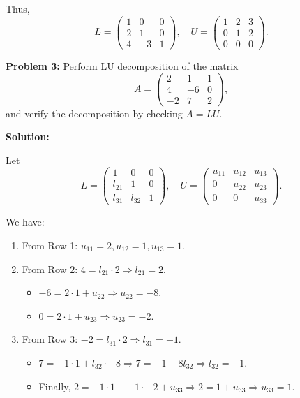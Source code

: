 \documentclass[
  letterpaper,
  DIV=11,
  numbers=noendperiod]{scrreprt}
\providecommand{\tightlist}{%
  \setlength{\itemsep}{0pt}\setlength{\parskip}{0pt}}\usepackage{longtable,booktabs,array}
\theoremstyle{plain}
\theoremstyle{definition}
\theoremstyle{remark}
\begin{document}
Thus,
\[ L = \begin{pmatrix} 1 & 0 & 0 \\ 2 & 1 & 0 \\ 4 & -3 & 1 \end{pmatrix}, \quad U = \begin{pmatrix} 1 & 2 & 3 \\ 0 & 1 & 2 \\ 0 & 0 & 0 \end{pmatrix}. \]

\textbf{Problem 3:} Perform LU decomposition of the matrix
\[ A = \begin{pmatrix} 2 & 1 & 1 \\ 4 & -6 & 0 \\ -2 & 7 & 2 \end{pmatrix}, \]
and verify the decomposition by checking \(A = LU\).

\textbf{Solution:}

Let
\[ L = \begin{pmatrix} 1 & 0 & 0 \\ l_{21} & 1 & 0 \\ l_{31} & l_{32} & 1 \end{pmatrix}, \quad U = \begin{pmatrix} u_{11} & u_{12} & u_{13} \\ 0 & u_{22} & u_{23} \\ 0 & 0 & u_{33} \end{pmatrix}. \]

We have:

\begin{enumerate}
\def\labelenumi{\arabic{enumi}.}
\tightlist
\item
  From Row 1: \(u_{11} = 2, u_{12} = 1, u_{13} = 1\).
\item
  From Row 2: \(4 = l_{21} \cdot 2 \Rightarrow l_{21} = 2\).

  \begin{itemize}
  \tightlist
  \item
    \(-6 = 2 \cdot 1 + u_{22} \Rightarrow u_{22} = -8\).
  \item
    \(0 = 2 \cdot 1 + u_{23} \Rightarrow u_{23} = -2\).
  \end{itemize}
\item
  From Row 3: \(-2 = l_{31} \cdot 2 \Rightarrow l_{31} = -1\).

  \begin{itemize}
  \tightlist
  \item
    \(7 = -1 \cdot 1 + l_{32} \cdot -8 \Rightarrow 7 = -1 - 8l_{32} \Rightarrow l_{32} = -1\).
  \item
    Finally,
    \(2 = -1 \cdot 1 + -1 \cdot -2 + u_{33} \Rightarrow 2 = 1 + u_{33} \Rightarrow u_{33} = 1\).
  \end{itemize}
\end{enumerate}
\end{document}
